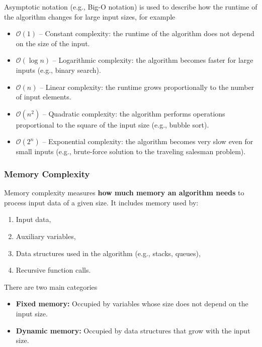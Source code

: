 \documentclass[../main]{subfiles}
\begin{document}
    Asymptotic notation (e.g., Big-O notation) is used to describe how the runtime of the algorithm changes for large input sizes, for example
\begin{itemize}
    \item \(\mathcal{O}(1)\) – Constant complexity: the runtime of the algorithm does not depend on the size of the input.
    \item \(\mathcal{O}(\log n)\) – Logarithmic complexity: the algorithm becomes faster for large inputs (e.g., binary search).
    \item \(\mathcal{O}(n)\) – Linear complexity: the runtime grows proportionally to the number of input elements.
    \item \(\mathcal{O}(n^2)\) – Quadratic complexity: the algorithm performs operations proportional to the square of the input size (e.g., bubble sort).
    \item \(\mathcal{O}(2^n)\) – Exponential complexity: the algorithm becomes very slow even for small inputs (e.g., brute-force solution to the traveling salesman problem).
\end{itemize}

\subsubsection{Memory Complexity}
Memory complexity measures \textbf{how much memory an algorithm needs} to process input data of a given size. It includes memory used by:
\begin{enumerate}
    \item Input data,
    \item Auxiliary variables,
    \item Data structures used in the algorithm (e.g., stacks, queues),
    \item Recursive function calls.
\end{enumerate}
There are two main categories
\begin{itemize}
    \item \textbf{Fixed memory:} Occupied by variables whose size does not depend on the input size.
    \item \textbf{Dynamic memory:} Occupied by data structures that grow with the input size.
\end{itemize}
\end{document}
